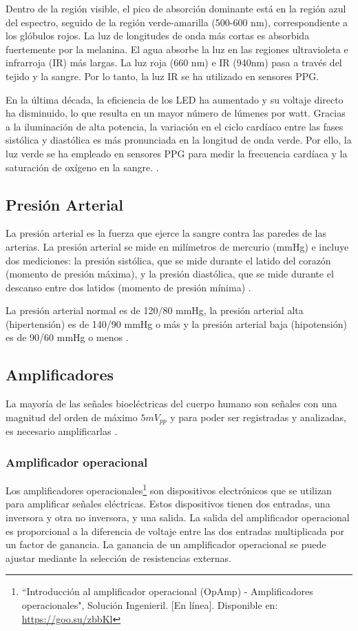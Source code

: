             Dentro de la región visible, el pico de absorción dominante está en la región azul del espectro, seguido de la región verde-amarilla (500-600 nm), correspondiente a los glóbulos rojos. La luz de longitudes de onda más cortas es absorbida fuertemente por la melanina. El agua absorbe la luz en las regiones ultravioleta e infrarroja (IR) más largas. La luz roja (660 nm) e IR (940nm) pasa a través del tejido y la sangre. Por lo tanto, la luz IR se ha utilizado en sensores PPG.
        
            En la última década, la eficiencia de los LED ha aumentado y su voltaje directo ha disminuido, lo que resulta en un mayor número de lúmenes por watt. Gracias a la iluminación de alta potencia, la variación en el ciclo cardíaco entre las fases sistólica y diastólica es más pronunciada en la longitud de onda verde. Por ello, la luz verde se ha empleado en sensores PPG para medir la frecuencia cardíaca y la saturación de oxígeno en la sangre. \cite{Tamura_2019}.

    \subsection{Presión Arterial}
        La presión arterial es la fuerza que ejerce la sangre contra las paredes de las arterias. La presión arterial se mide en milímetros de mercurio (mmHg) e incluye dos mediciones: la presión sistólica, que se mide durante el latido del corazón (momento de presión máxima), y la presión diastólica, que se mide durante el descanso entre dos latidos (momento de presión mínima) \cite{PresionArterialDefinicion}.

        La presión arterial normal es de 120/80 mmHg, la presión arterial alta (hipertensión) es de 140/90 mmHg o más y la presión arterial baja (hipotensión) es de 90/60 mmHg o menos \cite{DOF}.

    \subsection{Amplificadores}
    La mayoría de las señales bioeléctricas del cuerpo humano son señales con una magnitud del orden de máximo $5 mV_{pp}$ y para poder ser registradas y analizadas, es necesario amplificarlas \cite{Diaz_amplificacion_señales}.

        \subsubsection{Amplificador operacional}
            Los amplificadores operacionales\footnote{``Introducción al amplificador operacional (OpAmp) - Amplificadores operacionales", Solución Ingenieril. [En línea]. Disponible en: \url{https://goo.su/zbbKl}} son dispositivos electrónicos que se utilizan para amplificar señales eléctricas. Estos dispositivos tienen dos entradas, una inversora y otra no inversora, y una salida. La salida del amplificador operacional es proporcional a la diferencia de voltaje entre las dos entradas multiplicada por un factor de ganancia. La ganancia de un amplificador operacional se puede ajustar mediante la selección de resistencias externas.

